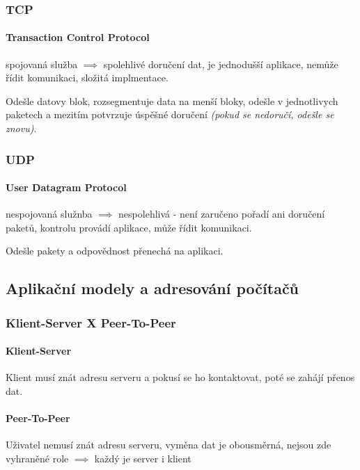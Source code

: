 \documentclass[10pt,a4paper]{article}
\begin{document}
\subsubsection{TCP}

\paragraph{Transaction Control Protocol} spojovaná služba $\implies$ spolehlivé doručení dat, je jednodušší aplikace, nemůže řídit komunikaci, složitá implmentace.

Odešle datovy blok, rozsegmentuje data na menší bloky, odešle v jednotlivych paketech a mezitím potvrzuje úspěšné doručení \textit{(pokud se nedoručí, odešle se znovu)}.

\subsubsection{UDP}

\paragraph{User Datagram Protocol} nespojovaná služnba $\implies$ nespolehlivá - není zaručeno pořadí ani doručení paketů, kontrolu provádí aplikace, může řídit komunikaci.

Odešle pakety a odpovědnost přenechá na aplikaci.

\subsection{Aplikační modely a adresování počítačů}

\subsubsection{Klient-Server X Peer-To-Peer}

\paragraph{Klient-Server} Klient musí znát adresu serveru a pokusí se ho kontaktovat, poté se zahájí přenos dat.

\paragraph{Peer-To-Peer} Uživatel nemusí znát adresu serveru, vyměna dat je obousměrná, nejsou zde vyhraněné role $\implies$ každý je server i klient
\end{document}
